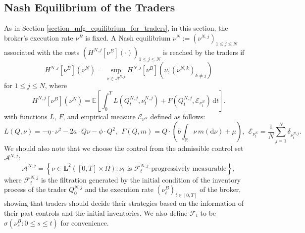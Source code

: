 \documentclass[10pt]{article}
\begin{document}
\subsection{Nash Equilibrium of the Traders}
As in Section \ref{section_mfg_equilibrium_for_traders}, in this section, the broker's execution rate \( \nu^B \) is fixed. A Nash equilibrium $\nu^N := (\nu^{N,j})_{1 \leq j \leq N}$ associated with the costs $(H^{N,j}[\nu^B](\cdot))_{1 \leq j \leq N}$ is reached by the traders if
\begin{equation*} 
    H^{N,j}\left[\nu^B\right]\left(\nu^N\right) = \underset{\nu \in \mathcal{A}^{N,j}}{\sup} H^{N,j}\left[\nu^B\right]\left(\nu,(\nu^{N,k})_{k \neq j}\right)
\end{equation*}
for $1 \leq j \leq N$, where
\begin{equation}\label{trader_obj_finite}
    H^{N,j}\left[\nu^B\right]\left(\nu^N\right) = \mathbb{E} \left[ \int_0^T L(Q_t^{N,j}, \nu_t^{N,j}) + F(Q_t^{N,j}, \mathcal{E}_{\nu_t^N}) \, \mathrm{d}t \right].
\end{equation}
with functions $L$, $F$, and empirical measure $\mathcal{E}_{\nu^N}$ defined as follows:
\[
    L(Q, \nu) = - \eta \cdot \nu^2 - 2a \cdot Q \nu - \phi \cdot Q^2,~~
    F(Q, m) = Q \cdot \left(b \int_{\mathbb{R}} \nu \, m(\mathrm{d}\nu) + \mu \right),~~
    \mathcal{E}_{\nu_t^N} = \frac{1}{N} \sum_{j=1}^N \delta_{\nu_t^{N,j}}.
\]
We should also note that we choose the control from the admissible control set $\mathcal{A}^{N,j}$:
\[
    \mathcal{A}^{N,j} = \left\{ \nu \in \mathbf{L}^2([0,T] \times \Omega): \nu_t \text{~is~} \mathcal{F}_t^{N,j}\text{-progressively measurable} \right\},
\]
where $\mathcal{F}_t^{N,j}$ is the filtration generated by the initial condition of the inventory process of the trader $Q_0^{N,j}$ and the execution rate $(\nu^B_t)_{t \in [0,T]}$ of the broker, 
showing that traders should decide their strategies based on the information of their past controls and the initial inventories. We also define $\mathcal{F}_t$ to be $\sigma\left(\nu^B_s : 0 \leq s \leq t\right)$ for convenience.
\end{document}
